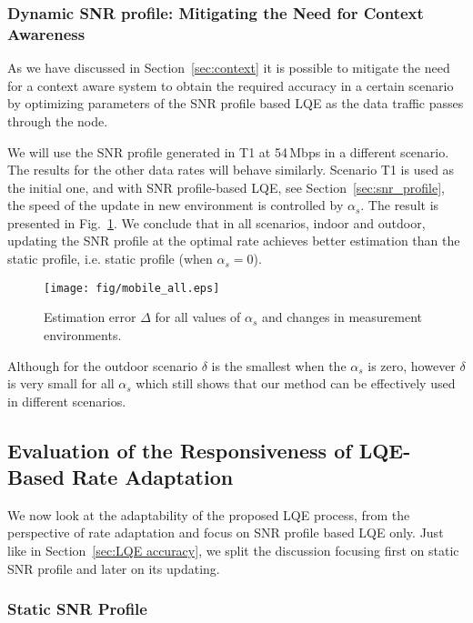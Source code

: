 \documentclass[11pt,draftclsnofoot,journal,onecolumn]{IEEEtran}
\begin{document}
\subsubsection{Dynamic SNR profile: Mitigating the Need for Context Awareness}
\label{sec:result_self_updating}

As we have discussed in Section~\ref{sec:context} it is possible to mitigate the need for a context aware system to obtain the required accuracy in a certain scenario by optimizing parameters of the SNR profile based LQE as the data traffic passes through the node.

We will use the SNR profile generated in T1 at 54\,Mbps in a different scenario. The results for the other data rates will behave similarly. Scenario T1 is used as the initial one, and with SNR profile-based LQE, see Section~\ref{sec:snr_profile}, the speed of the update in new environment is controlled by $\alpha_s$. The result is presented in Fig.~\ref{Fig_Updating effect}. We conclude that in all scenarios, indoor and outdoor, updating the SNR profile at the optimal rate achieves better estimation than the static profile, i.e. static profile (when $\alpha_s=0$).
\begin{figure}
\centering
\texttt{[image: fig/mobile\_all.eps]}
\caption{Estimation error $\Delta$ for all values of $\alpha_s$ and changes in measurement environments.}
\label{Fig_Updating effect}
\end{figure}


Although for the outdoor scenario $\delta$ is the smallest when the $\alpha_s$ is zero, however $\delta$ is very small for all $\alpha_s$ which still shows that our method can be effectively used in different scenarios.

\subsection{Evaluation of the Responsiveness of LQE-Based Rate Adaptation}
\label{sec:result_rate_adaptation}

We now look at the adaptability of the proposed LQE process, from the perspective of rate adaptation and focus on SNR profile based LQE only. Just like in Section~\ref{sec:LQE accuracy}, we split the discussion focusing first on static SNR profile and later on its updating.

\subsubsection{Static SNR Profile}
\label{sec:rate_static_profile}
\end{document}
